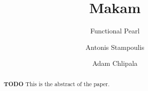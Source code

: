 \documentclass[format=acmlarge,review,anonymous]{acmart}\settopmatter{printfolios=true}
\begin{document}
\title{Makam}
\subtitle{Functional Pearl}

\author{Antonis Stampoulis}

\author{Adam Chlipala}

\newcommand\TODO[0]{\textbf{TODO}}
\newcommand\lamprolog[0]{$\lambda$Prolog\xspace}
\newcommand\fomega[0]{F$\omega$\xspace}
\renewenvironment{verbatim}{\begin{quote}\begin{alltt}}{\end{alltt}\end{quote}}
\newenvironment{codequote}{\begin{quote}\begin{alltt}}{\end{alltt}\end{quote}}
\newcommand\hide[1]{}
\newcommand\tightlist[0]{\itemsep1pt\parskip0pt\parsep0pt}

\begin{abstract}
\TODO{} This is the abstract of the paper.
\end{abstract}



\maketitle
\end{document}
